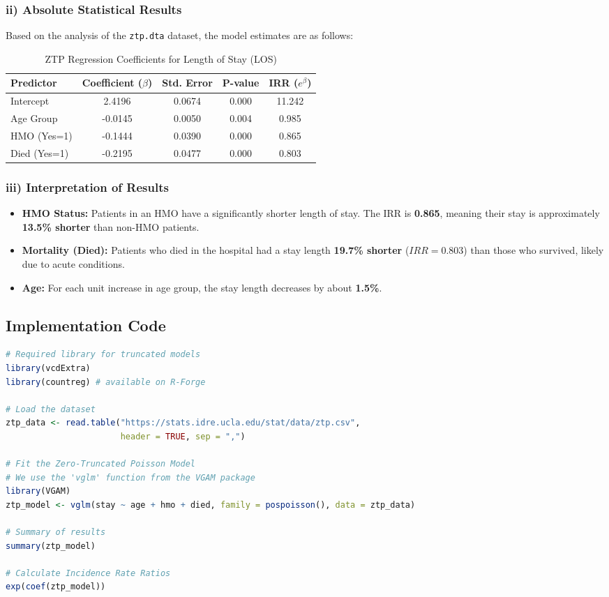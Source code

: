 \documentclass[12pt]{article}
\begin{document}
\subsubsection{ii) Absolute Statistical Results}
Based on the analysis of the \texttt{ztp.dta} dataset, the model estimates are as follows:

\begin{table}[h!]
\centering
\caption{ZTP Regression Coefficients for Length of Stay (LOS)}
\begin{tabular}{@{}lcccc@{}}
\toprule
Predictor & Coefficient ($\beta$) & Std. Error & P-value & IRR ($e^\beta$) \\ \midrule
Intercept & 2.4196 & 0.0674 & 0.000 & 11.242 \\
Age Group & -0.0145 & 0.0050 & 0.004 & 0.985 \\
HMO (Yes=1) & -0.1444 & 0.0390 & 0.000 & 0.865 \\
Died (Yes=1) & -0.2195 & 0.0477 & 0.000 & 0.803 \\ \bottomrule
\end{tabular}
\end{table}

\subsubsection{iii) Interpretation of Results}
\begin{itemize}
    \item \textbf{HMO Status:} Patients in an HMO have a significantly shorter length of stay. The IRR is \textbf{0.865}, meaning their stay is approximately \textbf{13.5\% shorter} than non-HMO patients.
    \item \textbf{Mortality (Died):} Patients who died in the hospital had a stay length \textbf{19.7\% shorter} ($IRR = 0.803$) than those who survived, likely due to acute conditions.
    \item \textbf{Age:} For each unit increase in age group, the stay length decreases by about \textbf{1.5\%}.
\end{itemize}

\subsection{Implementation Code}

\begin{lstlisting}[language=R, caption=R Implementation for ZTP Regression]
# Required library for truncated models
library(vcdExtra)
library(countreg) # available on R-Forge

# Load the dataset
ztp_data <- read.table("https://stats.idre.ucla.edu/stat/data/ztp.csv", 
                       header = TRUE, sep = ",")

# Fit the Zero-Truncated Poisson Model
# We use the 'vglm' function from the VGAM package
library(VGAM)
ztp_model <- vglm(stay ~ age + hmo + died, family = pospoisson(), data = ztp_data)

# Summary of results
summary(ztp_model)

# Calculate Incidence Rate Ratios
exp(coef(ztp_model))
\end{lstlisting}
\end{document}
